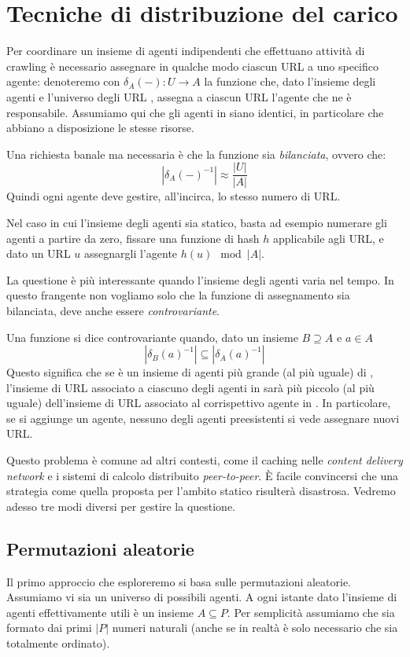 \chapter{Tecniche di distribuzione del carico}
Per coordinare un insieme  di agenti indipendenti che effettuano attività di crawling è necessario assegnare in qualche modo ciascun URL a uno specifico agente: denoteremo con $\delta_A(-): U \rightarrow A$ la funzione che, dato l'insieme degli agenti  e l'universo degli URL , assegna a ciascun URL l'agente che ne è responsabile. Assumiamo qui che gli agenti in  siano identici, in particolare che abbiano a disposizione le stesse risorse.

Una richiesta banale ma necessaria è che la funzione sia \textit{bilanciata}, ovvero che:
\begin{equation}
	|\delta_A(-)^{-1}| \approx \frac{|U|}{|A|}
\end{equation}
Quindi ogni agente deve gestire, all'incirca, lo stesso numero di URL.

Nel caso in cui l'insieme degli agenti sia statico, basta ad esempio numerare gli agenti a partire da zero, fissare una funzione di hash $h$ applicabile agli URL, e dato un URL $u$ assegnargli l'agente $h(u)\mod|A|$.

La questione è più interessante quando l'insieme degli agenti varia nel tempo. In questo frangente non vogliamo solo che la funzione di assegnamento sia bilanciata, deve anche essere \textit{controvariante}.

Una funzione si dice controvariante quando, dato un insieme $B \supseteq A$ e $a \in A$
\begin{equation}
	|\delta_B(a)^{-1}| \subseteq |\delta_A(a)^{-1}|
\end{equation}
Questo significa che se  è un insieme di agenti più grande (al più uguale) di , l'insieme di URL associato a ciascuno degli agenti in  sarà più piccolo (al più uguale) dell'insieme di URL associato al corrispettivo agente in . In particolare, se si aggiunge un agente, nessuno degli agenti preesistenti si vede assegnare nuovi URL.

Questo problema è comune ad altri contesti, come il caching nelle \textit{content delivery network} e i sistemi di calcolo distribuito \textit{peer-to-peer}. È facile convincersi che una strategia come quella proposta per l'ambito statico risulterà disastrosa. Vedremo adesso tre modi diversi per gestire la questione.
\section{Permutazioni aleatorie}
Il primo approccio che esploreremo si basa sulle permutazioni aleatorie. Assumiamo vi sia un universo  di possibili agenti. A ogni istante dato l'insieme di agenti effettivamente utili è un insieme $A \subseteq P$. Per semplicità assumiamo che  sia formato dai primi $|P|$ numeri naturali (anche se in realtà è solo necessario che  sia totalmente ordinato).

